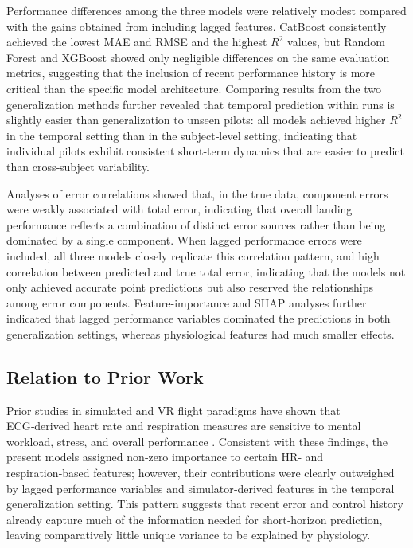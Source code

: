 \documentclass[11pt, a4paper]{article}
\begin{document}
Performance differences among the three models were relatively modest compared with the gains obtained from including lagged features. CatBoost consistently achieved the lowest MAE and RMSE and the highest $R^2$ values, but Random Forest and XGBoost showed only negligible differences on the same evaluation metrics, suggesting that the inclusion of recent performance history is more critical than the  specific model architecture. Comparing results from the two generalization methods further revealed that temporal prediction within runs is slightly easier than generalization to unseen pilots: all models achieved higher $R^2$ in the temporal setting than in the subject‑level setting, indicating that individual pilots exhibit consistent short‑term dynamics that are easier to predict than cross‑subject variability.

Analyses of error correlations showed that, in the true data, component errors were weakly associated with total error, indicating that overall landing performance reflects a combination of distinct error sources rather than being dominated by a single component. When lagged performance errors were included, all three models closely replicate this correlation pattern, and high correlation between predicted and true total error, indicating that the models not only achieved accurate point predictions but also reserved the relationships among error components. Feature-importance and SHAP analyses further indicated that lagged performance variables dominated the predictions in both generalization settings, whereas physiological features had much smaller effects.

\subsection{Relation to Prior Work}
Prior studies in simulated and VR flight paradigms have shown that ECG‑derived heart rate and respiration measures are sensitive to mental workload, stress, and overall performance \cite{koerner-2025,bruna-2018,grassmann-2016}. Consistent with these findings, the present models assigned non‑zero importance to certain HR‑ and respiration‑based features; however, their contributions were clearly outweighed by lagged performance variables and simulator‑derived features in the temporal generalization setting. This pattern suggests that recent error and control history already capture much of the information needed for short‑horizon prediction, leaving comparatively little unique variance to be explained by physiology.
\end{document}
